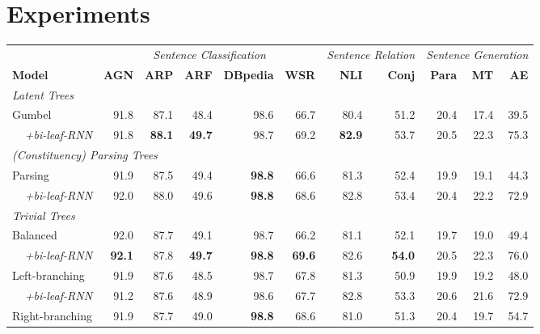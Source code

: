 \documentclass[11pt,a4paper]{article}
\begin{document}
\section{Experiments}
\label{sec:exprs}
\begin{table*}[t]
\centering
\begin{tabular}{l|rrrrr|rr|rrr}
     \toprule
     & \multicolumn{5}{c|}{\textit{\small Sentence Classification}} &\multicolumn{2}{c}{\textit{\small Sentence Relation}} &\multicolumn{3}{|c}{\small\textit{Sentence Generation}}\\
     \textbf{Model} & \textbf{AGN} & \textbf{ARP} & \textbf{ARF} & \textbf{DBpedia} & \textbf{WSR} & \textbf{NLI} & \textbf{Conj} & \textbf{Para} & \textbf{MT} & \textbf{AE} \\
     \midrule
     \multicolumn{11}{l}{\textit{{Latent Trees}}} \\
     \midrule
     Gumbel & 91.8  & 87.1  & 48.4  & 98.6  & 66.7  &  80.4  & 51.2  & 20.4  &  17.4  &  39.5 \\
     \multicolumn{1}{r|}{\textit{+bi-leaf-RNN}}  & 91.8  & \textbf{88.1}  & \textbf{49.7}  & 98.7  & 69.2  & \textbf{82.9}  & 53.7  & 20.5  & 22.3  & 75.3  \\
     \midrule
     \multicolumn{11}{l}{\textit{{(Constituency) Parsing Trees}}} \\
     \midrule
     Parsing & 91.9  & 87.5  & 49.4  & \textbf{98.8}  & 66.6  & 81.3  & 52.4  & 19.9  & 19.1  & 44.3  \\
     \multicolumn{1}{r|}{\textit{+bi-leaf-RNN}}  & 92.0  & 88.0  & 49.6  & \textbf{98.8}  & 68.6  & 82.8  & 53.4  & 20.4  & 22.2  & 72.9  \\
     \midrule
     \multicolumn{11}{l}{\textit{{Trivial Trees}}} \\
     \midrule
     Balanced & 92.0  & 87.7  & 49.1  & 98.7  & 66.2  & 81.1  &  52.1 & 19.7  & 19.0  & 49.4  \\
     \multicolumn{1}{r|}{\textit{+bi-leaf-RNN}}  & \textbf{92.1}  & 87.8  & \textbf{49.7}  & \textbf{98.8}  & \textbf{69.6}  & 82.6  & \textbf{54.0}  & 20.5  & 22.3  & 76.0  \\
     Left-branching & 91.9  & 87.6  & 48.5  & 98.7  & 67.8  & 81.3  & 50.9  & 19.9  & 19.2  &  48.0 \\
     \multicolumn{1}{r|}{\textit{+bi-leaf-RNN}}  & 91.2  & 87.6  & 48.9  & 98.6  & 67.7  & 82.8  & 53.3  & 20.6  & 21.6  & 72.9  \\
     Right-branching & 91.9  & 87.7  & 49.0  & \textbf{98.8}  & 68.6 & 81.0  & 51.3  &  20.4  &  19.7  &  54.7\\

\end{tabular}
\end{table*}
\end{document}
